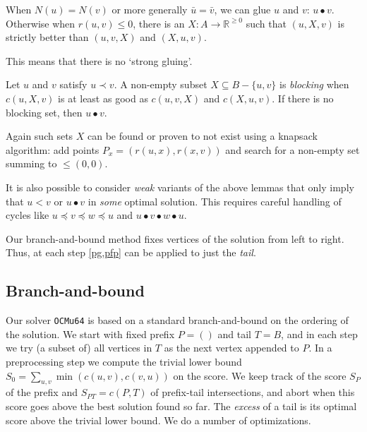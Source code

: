 \documentclass[a4paper,UKenglish,cleveref, autoref, thm-restate]{lipics-v2021}
\renewcommand{\b}{\prec}
\newcommand{\be}{\preceq}
\newcommand{\g}{\bullet}
\begin{document}
\begin{remark}
  When $N(u)=N(v)$ or more generally $\bar u=\bar v$, we can glue $u$ and $v$: $u\g v$.
  Otherwise when $r(u,v)\leq 0$, there is an $X : A\to \mathbb R^{\geq 0}$ such that $(u, X, v)$ is
  strictly better than $(u,v,X)$ and $(X,u,v)$.
\end{remark}
This means that there is no `strong gluing'.
\begin{lemma}\label{pg}
  Let $u$ and $v$ satisfy $u\b v$.
  A non-empty subset $X\subseteq B-\{u,v\}$ is \emph{blocking} when $c(u, X, v)$ is at
  least as good as $c(u,v,X)$ and $c(X,u,v)$.
  If there is no blocking set, then $u \g v$.
\end{lemma}
Again such sets $X$ can be found or proven to not exist using a knapsack
algorithm: add points $P_x = (r(u, x), r(x, v))$ and search for a non-empty
set summing to $\leq{}(0,0)$.

\begin{remark}
  It is also possible to consider \emph{weak} variants of the above lemmas that
  only imply that $u<v$ or $u\g v$ in \emph{some} optimal solution. This requires careful
  handling of cycles like $u\be v\be w\be u$ and $u\g v\g w\g u$.
\end{remark}

\begin{remark}
  Our branch-and-bound method fixes vertices of the
solution from left to right. Thus, at each step \cref{pg,pfp} can be applied to
just the \emph{tail}.
\end{remark}


\subsection{Branch-and-bound}
Our solver \texttt{OCMu64} is based on a standard branch-and-bound on the ordering of the
solution.  We start with fixed prefix $P=()$ and tail $T=B$, and in each step we try (a
subset of) all vertices in $T$ as the next vertex appended to $P$.
In a preprocessing step we compute the trivial lower bound $S_0 =
\sum_{u,v}\min(c(u,v),c(v,u))$ on the score.
We keep track of the score $S_P$ of the prefix and $S_{PT}=c(P, T)$ of
prefix-tail intersections, and abort when this score goes above the best
solution found so far. The \emph{excess} of a tail is its optimal score above
the trivial lower bound. We do a number of optimizations.
\end{document}
